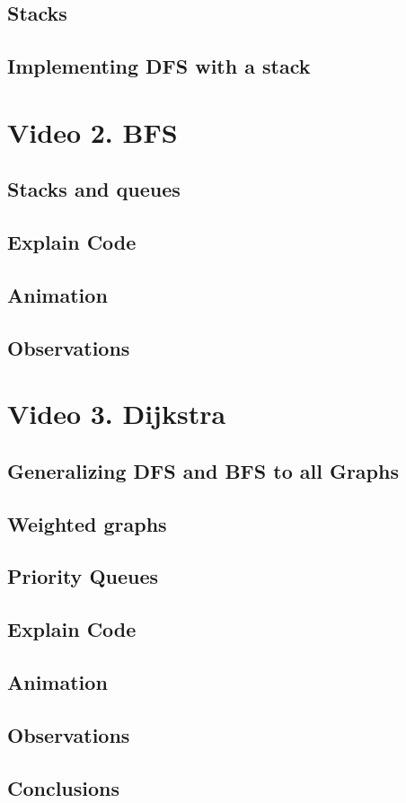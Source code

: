 \documentclass[12pt]{article}
\begin{document}
\subsection{Stacks}

\subsection{Implementing DFS with a stack}

\section{Video 2. BFS}

\subsection{Stacks and queues}

\subsection{Explain Code}

\subsection{Animation}

\subsection{Observations}

\section{Video 3. Dijkstra}

\subsection{Generalizing DFS and BFS to all Graphs}

\subsection{Weighted graphs}

\subsection{Priority Queues}

\subsection{Explain Code}

\subsection{Animation}

\subsection{Observations}

\subsection{Conclusions}
\end{document}

